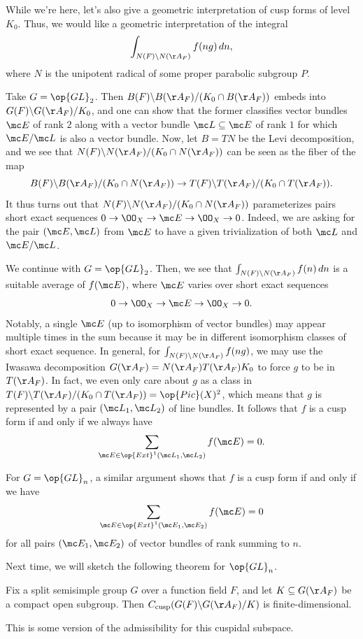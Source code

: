 \documentclass[../notes.tex]{subfiles}
\begin{document}
While we're here, let's also give a geometric interpretation of cusp forms of level $K_0$. Thus, we would like a geometric interpretation of the integral
\[\int_{N(F)\backslash N(\AA_F)}f(ng)\,dn,\]
where $N$ is the unipotent radical of some proper parabolic subgroup $P$.
\begin{example}
	Take $G=\op{GL}_2$. Then $B(F)\backslash B(\AA_F)/(K_0\cap B(\AA_F))$ embeds into $G(F)\backslash G(\AA_F)/K_0$, and one can show that the former classifies vector bundles $\mc E$ of rank $2$ along with a vector bundle $\mc L\subseteq\mc E$ of rank $1$ for which $\mc E/\mc L$ is also a vector bundle. Now, let $B=TN$ be the Levi decomposition, and we see that $N(F)\backslash N(\AA_F)/(K_0\cap N(\AA_F))$ can be seen as the fiber of the map
	\[B(F)\backslash B(\AA_F)/(K_0\cap N(\AA_F))\to T(F)\backslash T(\AA_F)/(K_0\cap T(\AA_F)).\]
	It thus turns out that $N(F)\backslash N(\AA_F)/(K_0\cap N(\AA_F))$ parameterizes pairs short exact sequences $0\to\OO_X\to\mc E\to\OO_X\to0$. Indeed, we are asking for the pair $(\mc E,\mc L)$ from $\mc E$ to have a given trivialization of both $\mc L$ and $\mc E/\mc L$.
\end{example}
\begin{example}
	We continue with  $G=\op{GL}_2$. Then, we see that $\int_{N(F)\backslash N(\AA_F)}f(n)\,dn$ is a suitable average of $f(\mc E)$, where $\mc E$ varies over short exact sequences
	\[0\to\OO_X\to\mc E\to\OO_X\to0.\]
	Notably, a single $\mc E$ (up to isomorphism of vector bundles) may appear multiple times in the sum because it may be in different isomorphism classes of short exact sequence. In general, for $\int_{N(F)\backslash N(\AA_F)}f(ng)$, we may use the Iwasawa decomposition $G(\AA_F)=N(\AA_F)T(\AA_F)K_0$ to force $g$ to be in $T(\AA_F)$. In fact, we even only care about $g$ as a class in $T(F)\backslash T(\AA_F)/(K_0\cap T(\AA_F))=\op{Pic}(X)^2$, which means that $g$ is represented by a pair $(\mc L_1,\mc L_2)$ of line bundles. It follows that $f$ is a cusp form if and only if we always have
	\[\sum_{\mc E\in\op{Ext}^1(\mc L_1,\mc L_2)}f(\mc E)=0.\]
\end{example}
\begin{remark}
	For $G=\op{GL}_n$, a similar argument shows that $f$ is a cusp form if and only if we have
	\[\sum_{\mc E\in\op{Ext}^1(\mc E_1,\mc E_2)}f(\mc E)=0\]
	for all pairs $(\mc E_1,\mc E_2)$ of vector bundles of rank summing to $n$.
\end{remark}
Next time, we will sketch the following theorem for $\op{GL}_n$.
\begin{theorem}
	Fix a split semisimple group $G$ over a function field $F$, and let $K\subseteq G(\AA_F)$ be a compact open subgroup. Then $C_{\mathrm{cusp}}(G(F)\backslash G(\AA_F)/K)$ is finite-dimensional.
\end{theorem}
This is some version of the admissibility for this cuspidal subspace.
\end{document}
